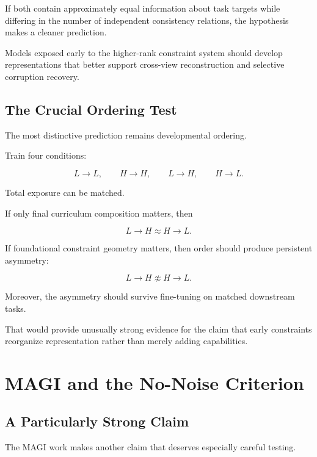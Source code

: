 \documentclass[11pt]{article}
\theoremstyle{remark}
\newcommand{\MAGI}{\textsc{MAGI}}
\begin{document}
If both contain approximately equal information about task targets while differing in the number of independent consistency relations, the hypothesis makes a cleaner prediction.

Models exposed early to the higher-rank constraint system should develop representations that better support cross-view reconstruction and selective corruption recovery.

\subsection{The Crucial Ordering Test}

The most distinctive prediction remains developmental ordering.

Train four conditions:

\begin{equation}
L\rightarrow L,
\qquad
H\rightarrow H,
\qquad
L\rightarrow H,
\qquad
H\rightarrow L.
\end{equation}

Total exposure can be matched.

If only final curriculum composition matters, then

\begin{equation}
L\rightarrow H
\approx
H\rightarrow L.
\end{equation}

If foundational constraint geometry matters, then order should produce persistent asymmetry:

\begin{equation}
L\rightarrow H
\not\approx
H\rightarrow L.
\end{equation}

Moreover, the asymmetry should survive fine-tuning on matched downstream tasks.

That would provide unusually strong evidence for the claim that early constraints reorganize representation rather than merely adding capabilities.

\section{MAGI and the No-Noise Criterion}

\subsection{A Particularly Strong Claim}

The \MAGI{} work makes another claim that deserves especially careful testing.
\end{document}
